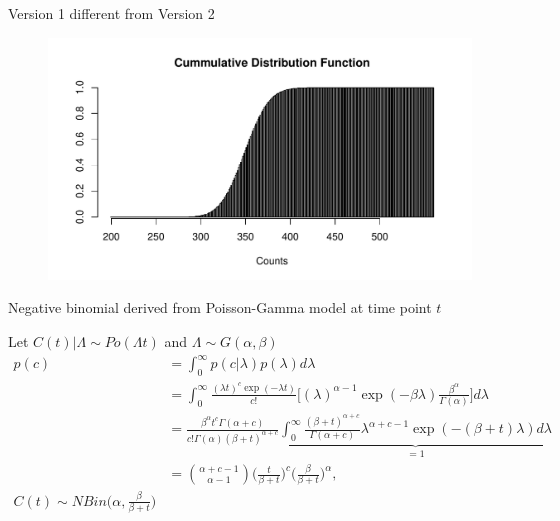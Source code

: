 \documentclass[english]{beamer}\usepackage[]{graphicx}\usepackage[]{xcolor}
\makeatletter
\def\maxwidth{ %
  \ifdim\Gin@nat@width>\linewidth
    \linewidth
  \else
    \Gin@nat@width
  \fi
}
\newenvironment{knitrout}{}{} %
\makeatother
\begin{document}
\begin{frame}{Version 1 different from Version 2}
\begin{figure}
\begin{knitrout}
\color{fgcolor}
\includegraphics[width=\maxwidth]{figures/figunnamed-chunk-7-1} 
\end{knitrout}

\end{figure}
\end{frame}

\begin{frame}[shrink = 5]{Negative binomial derived from Poisson-Gamma model at time point $t$}

Let $C(t)|\Lambda \sim Po(\Lambda t)$ and $\Lambda \sim G(\alpha,\beta)$
\begin{align*}
p(c)&=\int^\infty_0 p(c|\lambda) p(\lambda) d\lambda\\
&=\int^\infty_0 \frac{(\lambda t)^c\exp(-\lambda t)}{c!}\Bigg[(\lambda)^{\alpha-1}\exp(-\beta\lambda)\frac{\beta^\alpha}{\Gamma(\alpha)}\Bigg]d\lambda\\
&=\frac{\beta^\alpha t^c \Gamma(\alpha+c)}{c!\Gamma(\alpha) (\beta+t)^{\alpha+c}}\underbrace{\int^\infty_0 \frac{(\beta+t)^{\alpha+c}}{\Gamma(\alpha+c)} \lambda^{\alpha+c-1}\exp(-(\beta+t)\lambda)d\lambda}_{=1}\\
&=\binom{\alpha+c-1}{\alpha-1}\Bigg (\frac{t}{\beta+t}\Bigg)^{c} \Bigg(\frac{\beta}{\beta+t}\Bigg)^{\alpha}, \\
C(t)\sim NBin \Bigg(\alpha, \frac{\beta}{\beta+t}\Bigg)
\end{align*}
\end{frame}
\end{document}
